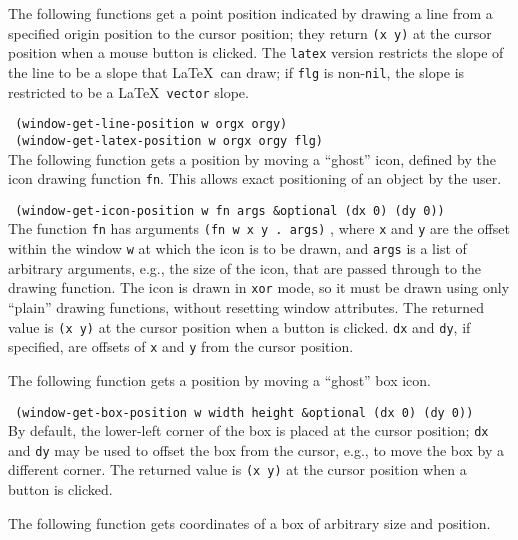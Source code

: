 The following functions get a point position indicated by drawing a line
from a specified origin position to the cursor position; they return
{\tt (x y)} at the cursor position when a mouse button is clicked.
The {\tt latex} version restricts the slope of the line to be a slope that
\LaTeX \ can draw; if {\tt flg} is non-{\tt nil}, the slope is restricted
to be a \LaTeX \ {\tt vector} slope.

{\tt \hspace*{0.5in} (window-get-line-position w orgx orgy)} \\
{\tt \hspace*{0.5in} (window-get-latex-position w orgx orgy flg)} \\

The following function gets a position by moving a ``ghost'' icon,
defined by the icon drawing function {\tt fn}.  This allows exact positioning
of an object by the user.

{\tt \hspace*{0.5in} (window-get-icon-position w fn args \&optional (dx 0)
 (dy 0))} \\

\vspace{-0.15in}
The function {\tt fn} has arguments {\tt (fn w x y . args)} , where {\tt x}
and {\tt y} are the offset within the window {\tt w} at which the icon is
to be drawn, and {\tt args} is a list of arbitrary arguments, e.g., the size
of the icon, that are passed through to the drawing function.
The icon is drawn in {\tt xor} mode, so it must be drawn using
only ``plain'' drawing functions, without resetting window attributes.
The returned value is {\tt (x y)} at the cursor position when a button
is clicked.  {\tt dx} and {\tt dy}, if specified, are offsets of {\tt x}
and {\tt y} from the cursor position.

The following function gets a position by moving a ``ghost'' box icon.

{\tt \hspace*{0.5in} (window-get-box-position w width height \&optional (dx 0) (dy 0))} \\

\vspace{-0.15in}
By default, the lower-left corner of the box is placed at the cursor position;
{\tt dx} and {\tt dy} may be used to offset the box from the cursor, e.g.,
to move the box by a different corner.  The returned value is {\tt (x y)}
at the cursor position when a button is clicked.

The following function gets coordinates of a box of arbitrary size and
position.

